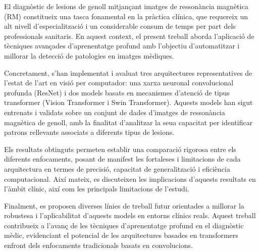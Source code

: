 \documentclass[twoside,spanish,a4paper,12pt]{tfg}
\begin{document}
\begin{resumen}
El diagnòstic de lesions de genoll mitjançant imatges de ressonància magnètica (RM) constitueix una tasca fonamental en la pràctica clínica, que requereix un alt nivell d’especialització i un considerable consum de temps per part dels professionals sanitaris. En aquest context, el present treball aborda l’aplicació de tècniques avançades d’aprenentatge profund amb l’objectiu d’automatitzar i millorar la detecció de patologies en imatges mèdiques.

Concretament, s’han implementat i avaluat tres arquitectures representatives de l’estat de l’art en visió per computador: una xarxa neuronal convolucional profunda (ResNet) i dos models basats en mecanismes d’atenció de tipus transformer (Vision Transformer i Swin Transformer). Aquests models han sigut entrenats i validats sobre un conjunt de dades d’imatges de ressonància magnètica de genoll, amb la finalitat d’analitzar la seua capacitat per identificar patrons rellevants associats a diferents tipus de lesions.

Els resultats obtinguts permeten establir una comparació rigorosa entre els diferents enfocaments, posant de manifest les fortaleses i limitacions de cada arquitectura en termes de precisió, capacitat de generalització i eficiència computacional. Així mateix, es discuteixen les implicacions d’aquests resultats en l’àmbit clínic, així com les principals limitacions de l’estudi.

Finalment, es proposen diverses línies de treball futur orientades a millorar la robustesa i l’aplicabilitat d’aquests models en entorns clínics reals. Aquest treball contribueix a l’avanç de les tècniques d’aprenentatge profund en el diagnòstic mèdic, evidenciant el potencial de les arquitectures basades en transformers enfront dels enfocaments tradicionals basats en convolucions.
\end{resumen}
\cleardoublepage
\end{document}
